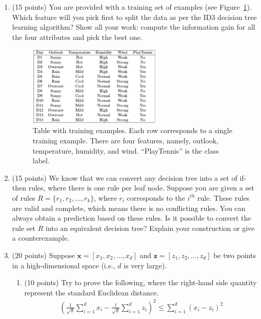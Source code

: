 \documentclass[11pt]{article}
\begin{document}
\begin{enumerate}

\item (15 points) You are provided with a training set of
examples (see Figure~\ref{fig:tree}). Which feature will you pick
first to split the data as per the ID3 decision tree learning
algorithm? Show all your work: compute the information gain for
all the four attributes and pick the best one.

\begin{figure}[ht]\label{fig:tree}
\begin{center}
    \includegraphics[width=0.6\textwidth]{FIG/tree.jpg}
    \caption{Table with training examples. Each row corresponds
    to a single training example. There are four features,
    namely, outlook, temperature, humidity, and wind.
    ``PlayTennis'' is the class label.}
\end{center}
\end{figure}

\item (15 points) We know that we can convert any decision tree
into a set of if-then rules, where there is one rule per leaf
node. Suppose you are given a set of rules $R = \{r_1, r_2,
\dots, r_k\}$, where $r_i$ corresponds to the $i^{th}$ rule.
{\color{red} These rules are valid and complete, which means
there is no conflicting rules. You can always obtain a prediction
based on these rules.} Is it possible to convert the rule set $R$
into an equivalent decision tree? Explain your construction or
give a counterexample.


\item (20 points) Suppose $\boldsymbol x = [x_1, x_2, \dots,
x_d]$ and $\boldsymbol z = [z_1, z_2, \dots, z_d]$ be two points in
a high-dimensional space (i.e., $d$ is very large).

\begin{enumerate}
    \item (10 points) Try to prove the following, where the
    right-hand side quantity represent the standard Euclidean
    distance.
    \begin{align*}
        \left(\frac{1}{\sqrt{d}}\sum_{i=1}^d x_i - \frac{1}{\sqrt{d}} \sum_{i=1}^d z_i \right)^2 \le
        \sum_{i=1}^d \left(x_i - z_i\right)^2
    \end{align*}


\end{enumerate}
\end{enumerate}
\end{document}
